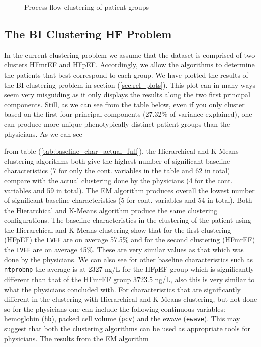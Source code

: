 \documentclass[../thesis.tex]{subfiles}
\begin{document}
\begin{figure}
    \centering
    
    \caption{Process flow clustering of patient groups}
    \label{fig:process_flow_clustering}
\end{figure}

\subsection{The BI Clustering HF Problem}
\label{subsec:bi_clust}

In the current clustering problem we assume that the dataset is comprised of two clusters HFmrEF and HFpEF. Accordingly, we allow the algorithms to determine the patients that best correspond to each group. We have plotted the results of the BI clustering problem in section (\ref{sec:rel_plots}). This plot can in many ways seem very misguiding as it only displays the results along the two first principal components. Still, as we can see from the table below, even if you only cluster based on the first four principal components (27.32\% of variance explained), one can produce more unique phenotypically distinct patient groups than the physicians. As we can see   





\noindent from table (\ref{tab:baseline_char_actual_full}), the  Hierarchical and K-Means clustering algorithms both give the highest number of significant baseline characteristics (7 for only the cont. variables in the table and 62 in total) compare with the actual clustering done by the physicians (4 for the cont. variables and 59 in total). The EM algorithm produces overall the lowest number of significant baseline characteristics (5 for cont. variables and 54 in total). Both the Hierarchical and K-Means algorithm produce the same clustering configurations. The baseline characteristics in the clustering of the patient using the Hierarchical and K-Means clustering show that for the first clustering (HFpEF) the \texttt{LVEF} are on average 57.5\% and for the second clustering (HFmrEF) the \texttt{LVEF} are on average 45\%. These are very similar values as that which was done by the physicians. We can also see for other baseline characteristics such as \texttt{ntprobnp} the average is at 2327 ng/L for the HFpEF group which is significantly different than that of the HFmrEF group 3723.5 ng/L, also this is very similar to what the physicians concluded with. For characteristics that are significantly different in the clustering with Hierarchical and K-Means clustering, but not done so for the physicians one can include the following continuous variables: hemoglobin (\texttt{hb}), packed cell volume (\texttt{pcv}) and the ewave (\texttt{ewave}). This may suggest that both the clustering algorithms can be used as appropriate tools for physicians. The results from the EM algorithm 
\end{document}
